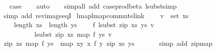 \begin{isabellebody}
\ \isamarkupfalse%
\ {\isacharquery}{\kern0pt}case\isanewline
\ \ \isamarkupfalse%
\ auto\isanewline
\ \ \isamarkupfalse%
\ {\isacharparenleft}{\kern0pt}simp{\isacharunderscore}{\kern0pt}all\ add{\isacharcolon}{\kern0pt}\ case{\isacharunderscore}{\kern0pt}prod{\isacharunderscore}{\kern0pt}beta\ lsubst{\isacharunderscore}{\kern0pt}simp{\isacharparenright}{\kern0pt}\isanewline
\ \ \isamarkupfalse%
\ {\isacharparenleft}{\kern0pt}simp\ add{\isacharcolon}{\kern0pt}\ rev{\isacharunderscore}{\kern0pt}image{\isacharunderscore}{\kern0pt}eqI{\isacharparenright}{\kern0pt}\isanewline
{}\isamarkupfalse%
%
\endisatagproof
{\isafoldproof}%
%
\isadelimproof
\isanewline
%
\endisadelimproof
\isanewline
\isanewline
{}\isamarkupfalse%
\ lmap{\isacharunderscore}{\kern0pt}lmap{\isacharunderscore}{\kern0pt}commute{\isacharunderscore}{\kern0pt}link{\isacharcolon}{\kern0pt}\isanewline
\ \ \ \ {\isachardoublequoteopen}v\ {\isasymin}\ set\ xs{\isachardoublequoteclose}\isanewline
\ \ \ \ {\isachardoublequoteopen}length\ xs\ {\isacharequal}{\kern0pt}\ length\ ys{\isachardoublequoteclose}\isanewline
\ \ \ \ {\isachardoublequoteopen}f\ {\isacharparenleft}{\kern0pt}lsubst\ {\isacharparenleft}{\kern0pt}zip\ xs\ ys{\isacharparenright}{\kern0pt}\ v{\isacharparenright}{\kern0pt}\ {\isacharequal}{\kern0pt}\isanewline
\ \ \ \ \ \ \ \ \ \ lsubst\ {\isacharparenleft}{\kern0pt}zip\ xs\ {\isacharparenleft}{\kern0pt}map\ f\ ys{\isacharparenright}{\kern0pt}{\isacharparenright}{\kern0pt}\ v{\isachardoublequoteclose}\isanewline
%
\isadelimproof
%
\endisadelimproof
%
\isatagproof
{}\isamarkupfalse%
\ {\isacharminus}{\kern0pt}\isanewline
\ \ \ \isamarkupfalse%
\ {\isachardoublequoteopen}zip\ xs\ {\isacharparenleft}{\kern0pt}map\ f\ ys{\isacharparenright}{\kern0pt}\ {\isacharequal}{\kern0pt}\ map\ {\isacharparenleft}{\kern0pt}{\isasymlambda}{\isacharparenleft}{\kern0pt}x{\isacharcomma}{\kern0pt}y{\isacharparenright}{\kern0pt}{\isachardot}{\kern0pt}\ {\isacharparenleft}{\kern0pt}x{\isacharcomma}{\kern0pt}\ f\ y{\isacharparenright}{\kern0pt}{\isacharparenright}{\kern0pt}\ {\isacharparenleft}{\kern0pt}zip\ xs\ ys{\isacharparenright}{\kern0pt}{\isachardoublequoteclose}\isanewline
\ \ \ \ \ \isamarkupfalse%
\ {\isacharparenleft}{\kern0pt}simp\ add{\isacharcolon}{\kern0pt}\ zip{\isacharunderscore}{\kern0pt}map{}{\isacharparenright}{\kern0pt}\isanewline
\ \ \isamarkupfalse%

\end{isabellebody}
